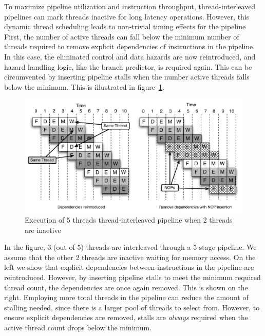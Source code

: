 To maximize pipeline utilization and instruction throughput, thread-interleaved pipelines can mark threads inactive for long latency operations.   
However, this dynamic thread scheduling leads to non-trivial timing effects for the pipeline 
First, the number of active threads can fall below the minimum number of threads required to remove explicit dependencies of instructions in the pipeline.
In this case, the eliminated control and data hazards are now reintroduced, and hazard handling logic, like the branch predictor, is required again. 
This can be circumvented by inserting pipeline stalls when the number active threads falls below the minimum.
This is illustrated in figure~\ref{fig:three_thread_pipeline}.
\begin{figure}[h]
  \vspace{-10pt}
  \begin{center}
    \includegraphics[scale=.6]{figs/three_thread_pipeline}
  \end{center}
  \vspace{-10pt}
  \caption{Execution of 5 threads thread-interleaved pipeline when 2 threads are inactive}
  \label{fig:three_thread_pipeline}
\end{figure}
In the figure, 3 (out of 5) threads are interleaved through a 5 stage pipeline. 
We assume that the other 2 threads are inactive waiting for memory access.    
On the left we show that explicit dependencies between instructions in the pipeline are reintroduced.
However, by inserting pipeline stalls to meet the minimum required thread count, the dependencies are once again removed.
This is shown on the right.   
Employing more total threads in the pipeline can reduce the amount of stalling needed, since there is a larger pool of threads to select from.  
However, to ensure explicit dependencies are removed, stalls are \emph{always} required when the active thread count drops below the minimum.

